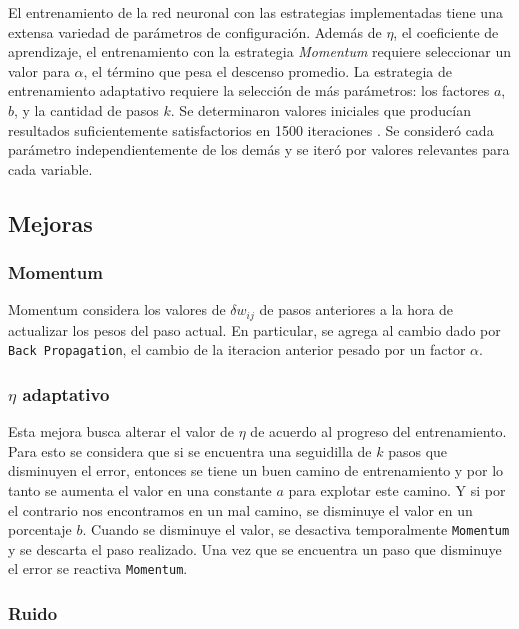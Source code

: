 \documentclass[a4paper,10pt]{article}
\begin{document}
        \label{less_rollbacks}
        El entrenamiento de la red neuronal con las estrategias implementadas tiene una extensa variedad de parámetros de configuración. Además de $\eta$, 
        el coeficiente de aprendizaje, el entrenamiento con la estrategia \textit{Momentum} requiere seleccionar un valor para $\alpha$, el término que pesa el descenso promedio. 
        La estrategia de entrenamiento adaptativo requiere la selección de más parámetros: los factores $a$, $b$, y la cantidad de pasos $k$.
        Se determinaron valores iniciales que producían resultados suficientemente satisfactorios en 1500 iteraciones . Se consideró cada parámetro independientemente de 
        los demás y se iteró por valores relevantes para cada variable.

    \subsection{Mejoras}

        \subsubsection{Momentum}

        Momentum considera los valores de $\delta w_{ij}$ de pasos anteriores a la hora de actualizar los pesos del paso actual.
        En particular, se agrega al cambio dado por \texttt{Back Propagation}, el cambio de la iteracion anterior pesado por un factor $\alpha$.

        \subsubsection{$\eta$ adaptativo}

        Esta mejora busca alterar el valor de $\eta$ de acuerdo al progreso del entrenamiento.
        Para esto se considera que si se encuentra una seguidilla de $k$ pasos que disminuyen el error, entonces se tiene un buen camino de entrenamiento y por lo tanto se aumenta 
        el valor en una constante $a$ para explotar este camino. Y si por el contrario nos encontramos en un mal camino, se disminuye el valor en un porcentaje $b$.
        Cuando se disminuye el valor, se desactiva temporalmente \texttt{Momentum} y se descarta el paso realizado.
        Una vez que se encuentra un paso que disminuye el error se reactiva \texttt{Momentum}.

        \subsubsection{Ruido}
\end{document}
